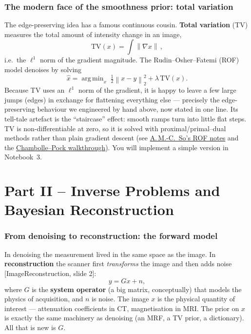 \documentclass[11pt]{article}
\newcommand{\xhat}{\hat{x}}
\newcommand{\norm}[1]{\left\lVert #1 \right\rVert}
\newcommand{\deck}[1]{\textsf{\small[#1]}}
\DeclareMathOperator*{\argmin}{arg\,min}
\begin{document}
\section{The modern face of the smoothness prior: total variation}

The edge-preserving idea has a famous continuous cousin. \textbf{Total
variation} (TV) measures the total amount of intensity change in an image,
\[
\mathrm{TV}(x) = \int \norm{\nabla x}\, ,
\]
i.e.\ the $\ell^1$ norm of the gradient magnitude. The
Rudin--Osher--Fatemi (ROF) model denoises by solving
\[
\xhat = \argmin_x\; \tfrac12\norm{x-y}_2^2 + \lambda\,\mathrm{TV}(x).
\]
Because TV uses an $\ell^1$ norm of the gradient, it is happy to leave a few
large jumps (edges) in exchange for flattening everything else --- precisely
the edge-preserving behaviour we engineered by hand above, now stated in one
line. Its tell-tale artefact is the ``staircase'' effect: smooth ramps turn
into little flat steps. TV is non-differentiable at zero, so it is solved with
proximal/primal--dual methods rather than plain gradient descent (see
\href{https://angms.science/doc/TV/TV.pdf}{A.\,M.-C.\ So's ROF notes} and the
\href{https://sangillee.com/2026-01-06-total-variation-minimization/}{Chambolle--Pock walkthrough}).
You will implement a simple version in Notebook~3.

\part*{Part II -- Inverse Problems and Bayesian Reconstruction}

\section{From denoising to reconstruction: the forward model}

In denoising the measurement lived in the same space as the image. In
\textbf{reconstruction} the scanner first \emph{transforms} the image and then
adds noise \deck{ImageReconstruction, slide 2}:
\[
y = G x + n,
\]
where $G$ is the \textbf{system operator} (a big matrix, conceptually) that
models the physics of acquisition, and $n$ is noise. The image $x$ is the
physical quantity of interest --- attenuation coefficients in CT, magnetisation
in MRI. The prior on $x$ is exactly the same machinery as denoising (an MRF, a
TV prior, a dictionary). All that is new is $G$.
\end{document}

